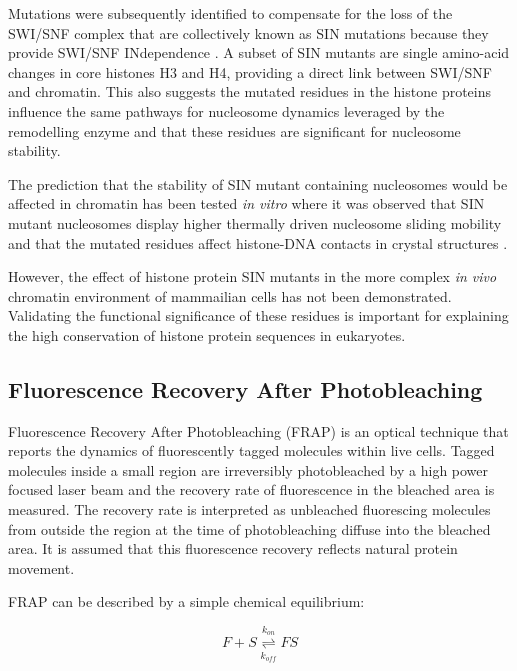     Mutations were subsequently identified to compensate for the
    loss of the SWI/SNF complex that are collectively known as SIN
    mutations because they provide SWI/SNF INdependence
    \citep{kruger1995amino}.  A subset of SIN mutants are single
    amino-acid changes in core histones H3 and H4, providing a direct
    link between SWI/SNF and chromatin.  This also suggests the
    mutated residues in the histone proteins influence the same
    pathways for nucleosome dynamics leveraged by the remodelling enzyme and that
    these residues are significant for nucleosome stability.

    The prediction that the stability of SIN mutant containing
    nucleosomes would be affected in chromatin has been tested \textit{in vitro}
    where it was observed that SIN mutant nucleosomes display higher 
    thermally driven nucleosome sliding mobility \citep{flaus2004sin}
    and that the mutated residues affect histone-DNA contacts in
    crystal structures \citep{muthurajan2004crystal}.

    However, the effect of histone protein SIN mutants
    in the more complex \textit{in vivo} chromatin environment 
    of mammailian cells has not been demonstrated.
    Validating the functional significance of these residues
    is important for explaining the high conservation of 
    histone protein sequences in eukaryotes.

  \subsection{Fluorescence Recovery After Photobleaching}

    Fluorescence Recovery After Photobleaching (FRAP) is an optical technique
    that reports the dynamics of fluorescently tagged molecules within live cells.
    Tagged molecules inside a small region are irreversibly photobleached by
    a high power focused laser beam and the recovery rate of fluorescence
    in the bleached area is measured. The recovery rate is interpreted 
    as unbleached fluorescing molecules from outside the region 
    at the time of photobleaching diffuse into the bleached area.
    It is assumed that this fluorescence recovery reflects natural protein movement.

    FRAP can be described by a simple chemical equilibrium:

    \begin{displaymath}
      F + S \overset{k_{on}}{\underset{k_{off}}{\rightleftharpoons}} FS
    \end{displaymath}

